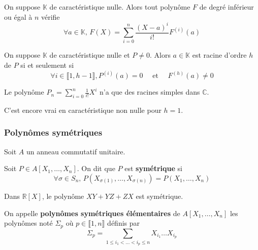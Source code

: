   \begin{theorem}
    On suppose $\mathbb{K}$ de caractéristique nulle. Alors tout polynôme $F$ de degré inférieur ou égal à $n$ vérifie
    \[ \forall a \in \mathbb{K}, \, F(X) = \sum_{i=0}^{n} \frac{(X-a)^i}{i!} F^{(i)}(a) \]
  \end{theorem}

  \begin{corollary}
    On suppose $\mathbb{K}$ de caractéristique nulle et $P \neq 0$. Alors $a \in \mathbb{K}$ est racine d'ordre $h$ de $P$ si et seulement si
    \[ \forall i \in \llbracket 1, h-1 \rrbracket, P^{(i)}(a) = 0 \quad \text{ et } \quad F^{(h)}(a) \neq 0 \]
  \end{corollary}

  \begin{example}
    Le polynôme $P_n = \sum_{i=0}^{n} \frac{1}{i!} X^{i}$ n'a que des racines simples dans $\mathbb{C}$.
  \end{example}

  \begin{remark}
    C'est encore vrai en caractéristique non nulle pour $h = 1$.
  \end{remark}

  \subsubsection{Polynômes symétriques}

  Soit $A$ un anneau commutatif unitaire.


  \begin{definition}
    Soit $P \in A[X_1, \dots, X_n]$. On dit que $P$ est \textbf{symétrique} si
    \[ \forall \sigma \in S_n, \, P(X_{\sigma(1)}, \dots, X_{\sigma(n)}) = P(X_1, \dots, X_n) \]
  \end{definition}

  \begin{example}
    Dans $\mathbb{R}[X]$, le polynôme $XY + YZ + ZX$ est symétrique.
  \end{example}

  \begin{definition}
    On appelle \textbf{polynômes symétriques élémentaires} de $A[X_1, \dots, X_n]$ les polynômes noté $\Sigma_p$ où $p \in \llbracket 1, n \rrbracket$ définis par
    \[ \Sigma_p = \sum_{1 \leq i_1 < \dots < i_p \leq n} X_{i_1} \dots X_{i_p} \]
  \end{definition}

